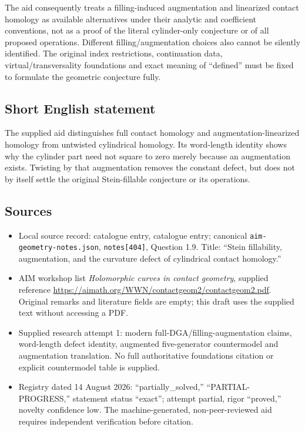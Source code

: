 \documentclass[11pt]{article}
\begin{document}
The aid consequently treats a filling-induced augmentation and linearized contact homology as available alternatives under their analytic and coefficient conventions, not as a proof of the literal cylinder-only conjecture or of all proposed operations. Different filling/augmentation choices also cannot be silently identified. The original index restrictions, continuation data, virtual/transversality foundations and exact meaning of ``defined'' must be fixed to formulate the geometric conjecture fully.
\subsection{Short English statement}
The supplied aid distinguishes full contact homology and augmentation-linearized homology from untwisted cylindrical homology. Its word-length identity shows why the cylinder part need not square to zero merely because an augmentation exists. Twisting by that augmentation removes the constant defect, but does not by itself settle the original Stein-fillable conjecture or its operations.
\subsection{Sources}
\begin{itemize}
\item Local source record: catalogue entry, catalogue entry; canonical \texttt{aim-geometry-notes.json}, \texttt{notes[404]}, Question 1.9. Title: ``Stein fillability, augmentation, and the curvature defect of cylindrical contact homology.''
\item AIM workshop list \emph{Holomorphic curves in contact geometry}, supplied reference \url{https://aimath.org/WWN/contactgeom2/contactgeom2.pdf}. Original remarks and literature fields are empty; this draft uses the supplied text without accessing a PDF.
\item Supplied research attempt 1: modern full-DGA/filling-augmentation claims, word-length defect identity, augmented five-generator countermodel and augmentation translation. No full authoritative foundations citation or explicit countermodel table is supplied.
\item Registry dated 14 August 2026: ``partially\_solved,'' ``PARTIAL-PROGRESS,'' statement status ``exact''; attempt partial, rigor ``proved,'' novelty confidence low. The machine-generated, non-peer-reviewed aid requires independent verification before citation.
\end{itemize}
\end{document}
